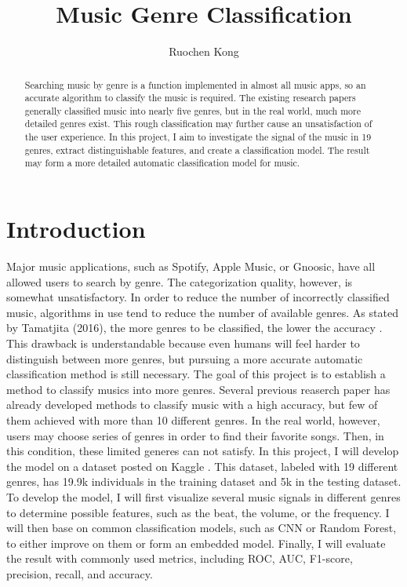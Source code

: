 \documentclass[sigconf ,nonacm]{acmart}
\begin{document}
\title{Music Genre Classification}

\author{Ruochen Kong}

\begin{abstract}
Searching music by genre is a function implemented in almost all music apps, so an accurate algorithm to classify the music is required. The existing research papers generally classified music into nearly five genres, but in the real world, much more detailed genres exist. This rough classification may further cause an unsatisfaction of the user experience. In this project, I aim to investigate the signal of the music in 19 genres, extract distinguishable features, and create a classification model. The result may form a more detailed automatic classification model for music.
\end{abstract}

\maketitle

\section{Introduction}
Major music applications, such as Spotify, Apple Music, or Gnoosic, have all allowed users to search by genre. The categorization quality, however, is somewhat unsatisfactory. In order to reduce the number of incorrectly classified music, algorithms in use tend to reduce the number of available genres. As stated by Tamatjita (2016), the more genres to be classified, the lower the accuracy \cite{7930314}. This drawback is understandable because even humans will feel harder to distinguish between more genres, but pursuing a more accurate automatic classification method is still necessary. The goal of this project is to establish a method to classify musics into more genres. Several previous reaserch paper has already developed methods to classify music with a high accuracy, but few of them achieved with more than 10 different genres. In the real world, however, users may choose series of genres in order to find their favorite songs. Then, in this condition, these limited generes can not satisfy. In this project, I will develop the model on a dataset posted on Kaggle \cite{kaggle}. This dataset, labeled with 19 different genres, has 19.9k individuals in the training dataset and 5k in the testing dataset. To develop the model, I will first visualize several music signals in different genres to determine possible features, such as the beat, the volume, or the frequency. I will then base on common classification models, such as CNN or Random Forest, to either improve on them or form an embedded model. Finally, I will evaluate the result with commonly used metrics, including ROC, AUC, F1-score, precision, recall, and accuracy.
\end{document}
